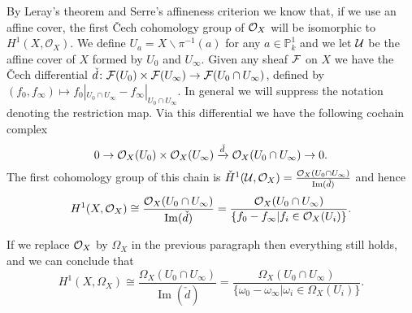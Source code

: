 \documentclass[draft, 11pt]{article} %
\theoremstyle{plain}
\theoremstyle{remark}
\newcommand{\cO}{{\cal O}}
\newcommand{\cech}{\v{C}ech }
\newcommand{\hone}{H^1(X,\mathcal{O}_X)}
\newcommand{\cechhone}{\check{H}^1(\mathcal U,\mathcal O_X)}
\DeclareMathOperator{\Ima}{Im}
\begin{document}
By Leray's theorem \cite[Thm 5.2.12]{liu} and Serre's affineness criterion \cite[Thm 5.2.23]{liu} we know that, if we use an affine cover, the first \cech cohomology group of $\cO_X$ will be isomorphic to $\hone$.
We define $U_a = X \backslash \pi^{-1}(a)$ for any $a \in \mathbb P_k^1$ and we let ${\cal U}$ be the affine cover of $X$ formed by $U_0$ and $U_\infty$.
Given any sheaf $\cal F$ on $X$ we have the \cech differential $\check{d}\colon {\cal F}(U_0) \times {\cal F} (U_\infty) \rightarrow {\cal F}(U_0 \cap U_\infty)$, defined by $(f_0,f_\infty) \mapsto f_0|_{U_0 \cap U_\infty} - f_\infty|_{U_0 \cap U_\infty}$.
In general we will suppress the notation denoting the restriction map.
Via this differential we have the following cochain complex
\begin{equation*}
0 \rightarrow \cO_X(U_0)\times \cO_X(U_\infty) \xrightarrow{\check{d}} \cO_X(U_0 \cap U_\infty) \rightarrow 0.
\end{equation*}
The first cohomology group of this chain is $\cechhone = \frac{\cO_X(U_0 \cap U_\infty)}{\Ima(\check{d})}$ and hence
\begin{equation}\label{cechhone}
\hone \cong \frac{\cO_X(U_0 \cap U_\infty)}{\Ima(\check{d})}  
 = \frac{\cO_X(U_0 \cap U_\infty)}{\{f_0 - f_\infty | f_i \in \cO_X(U_i) \}}.
\end{equation}

If we replace $\cO_X$ by $\Omega_X$ in the previous paragraph then everything still holds, and we can conclude that
\[
H^1(X,\Omega_X) \cong \frac{\Omega_X(U_0 \cap U_\infty)}{\Ima(\check{d})} = \frac{\Omega_X(U_0 \cap U_\infty)}{\{\omega_0 - \omega_ \infty | \omega_i \in \Omega_X(U_i)\}}.
\]
\end{document}
